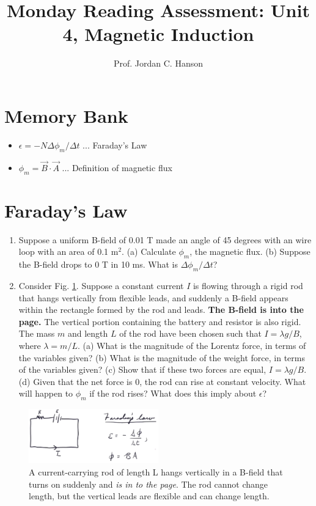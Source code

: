 \documentclass{article}
\begin{document}
\title{Monday Reading Assessment: Unit 4, Magnetic Induction}
\author{Prof. Jordan C. Hanson}

\maketitle

\section{Memory Bank}

\begin{itemize}
\item $\epsilon = -N \Delta \phi_m /\Delta t$ ... Faraday's Law
\item $\phi_m = \vec{B} \cdot \vec{A}$ ... Definition of magnetic flux
\end{itemize}

\section{Faraday's Law}

\begin{enumerate}
\item Suppose a uniform B-field of 0.01 T made an angle of 45 degrees with an wire loop with an area of 0.1 m$^2$.  (a) Calculate $\phi_m$, the magnetic flux. (b) Suppose the B-field drops to 0 T in 10 ms.  What is $\Delta \phi_m / \Delta t$? \\ \vspace{2cm}
\item Consider Fig. \ref{fig:current}.  Suppose a constant current $I$ is flowing through a rigid rod that hangs vertically from flexible leads, and suddenly a B-field appears within the rectangle formed by the rod and leads.  \textbf{The B-field is into the page.}  The vertical portion containing the battery and resistor is also rigid.  The mass $m$ and length $L$ of the rod have been chosen such that $I = \lambda g / B$, where $\lambda = m/L$.  (a) What is the magnitude of the Lorentz force, in terms of the variables given?  (b) What is the magnitude of the weight force, in terms of the variables given?  (c)  Show that if these two forces are equal, $I = \lambda g / B$. (d) Given that the net force is 0, the rod can rise at constant velocity.  What will happen to $\phi_m$ if the rod rises?  What does this imply about $\epsilon$? 
\end{enumerate}
\begin{figure}
\centering
\includegraphics[width=0.5\textwidth]{current.png}
\caption{\label{fig:current} A current-carrying rod of length L hangs vertically in a B-field that turns on suddenly and \textit{is in to the page}.  The rod cannot change length, but the vertical leads are flexible and can change length.}
\end{figure}
\end{document}
